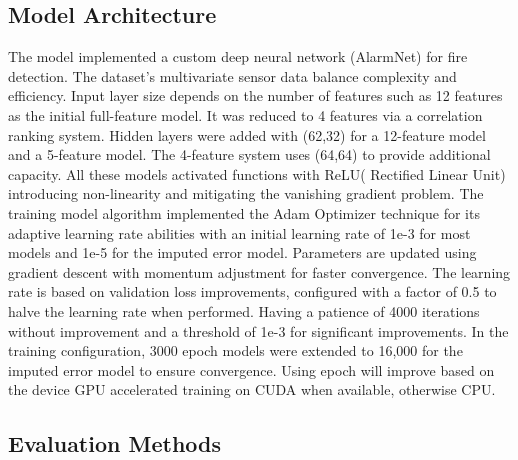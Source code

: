 \documentclass[conference]{IEEEtran}
\begin{document}
\subsection{Model Architecture}
The model implemented a custom deep neural network
(AlarmNet) for fire detection. The dataset's multivariate
sensor data balance complexity and efficiency. Input layer
size depends on the number of features such as 12 features
as the initial full-feature model. It was reduced to 4
features via a correlation ranking system. Hidden layers
were added with (62,32) for a 12-feature model and a
5-feature model. The 4-feature system uses (64,64) to
provide additional capacity. All these models activated
functions with ReLU( Rectified Linear Unit) introducing
non-linearity and mitigating the vanishing gradient problem.
The training model algorithm implemented the Adam Optimizer
technique for its adaptive learning rate abilities with an
initial learning rate of 1e-3 for most models and 1e-5 for
the imputed error model. Parameters are updated using
gradient descent with momentum adjustment for faster
convergence. The learning rate is based on validation loss
improvements, configured with a factor of 0.5 to halve the
learning rate when performed. Having a patience of 4000
iterations without improvement and a threshold of 1e-3 for
significant improvements. In the training configuration,
3000 epoch models were extended to 16,000 for the imputed
error model to ensure convergence. Using epoch will improve
based on the device GPU accelerated training on CUDA when
available, otherwise CPU. 

\subsection{Evaluation Methods}
\end{document}
